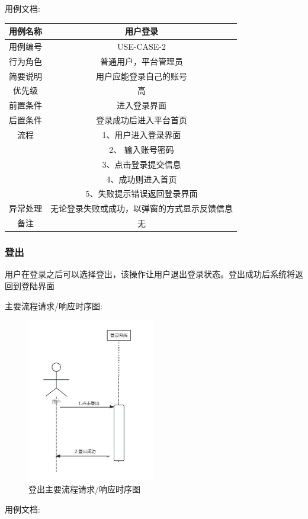 \documentclass[12pt]{ctexart} %
\begin{document}
用例文档:

\begin{tabular}{|c|c|}
  \hline
  用例名称& 用户登录\\
  \hline
  用例编号 & USE-CASE-2\\
  \hline
  行为角色 & 普通用户，平台管理员\\
  \hline
  简要说明 & 用户应能登录自己的账号\\
  \hline
  优先级 & 高\\
  \hline
  前置条件 & 进入登录界面\\
  \hline
  后置条件 & 登录成功后进入平台首页\\
  \hline
  流程 & 1、用户进入登录界面\\
      & 2、 输入账号密码\\
      & 3、点击登录提交信息\\
      & 4、成功则进入首页\\
      & 5、失败提示错误返回登录界面\\
  \hline
  异常处理 & 无论登录失败或成功，以弹窗的方式显示反馈信息\\
  \hline
  备注 & 无\\
  \hline
\end{tabular}

\subsubsection{登出}
用户在登录之后可以选择登出，该操作让用户退出登录状态。登出成功后系统将返回到登陆界面

主要流程请求/响应时序图:
\begin{figure}[ht]
  \centering
  \includegraphics[width=0.5\textwidth]{yongli3.jpg}
  \caption{登出主要流程请求/响应时序图}
\end{figure}
用例文档:
\end{document}
